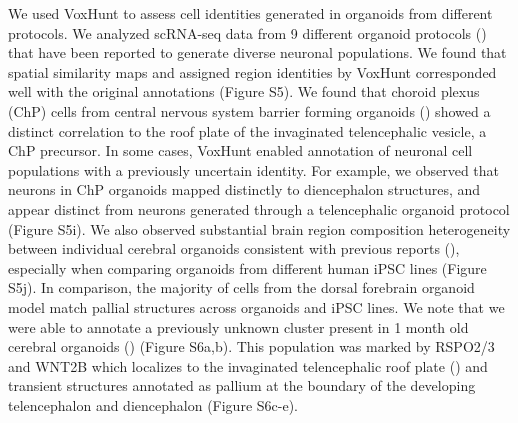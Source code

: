 We used VoxHunt to assess cell identities generated in organoids from different protocols. We analyzed scRNA-seq data from 9 different organoid protocols (\cite{bhaduri_cell_2020,birey_assembly_2017,giandomenico_cerebral_2019,kanton_organoid_2019,pellegrini_human_2020,pollen_establishing_2019,velasco_individual_2019,xiang_hesc-derived_2019}) that have been reported to generate diverse neuronal populations. We found that spatial similarity maps and assigned region identities by VoxHunt corresponded well with the original annotations (Figure S5). We found that choroid plexus (ChP) cells from central nervous system barrier forming organoids (\cite{pellegrini_human_2020}) showed a distinct correlation to the roof plate of the invaginated telencephalic vesicle, a ChP precursor. In some cases, VoxHunt enabled annotation of neuronal cell populations with a previously uncertain identity. For example, we observed that neurons in ChP organoids mapped distinctly to diencephalon structures, and appear distinct from neurons generated through a telencephalic organoid protocol (Figure S5i). We also observed substantial brain region composition heterogeneity between individual cerebral organoids consistent with previous reports (\cite{kanton_organoid_2019}), especially when comparing organoids from different human iPSC lines (Figure S5j). In comparison, the majority of cells from the dorsal forebrain organoid model match pallial structures across organoids and iPSC lines. We note that we were able to annotate a previously unknown cluster present in 1 month old cerebral organoids (\cite{camp_human_2015}) (Figure S6a,b). This population was marked by RSPO2/3 and WNT2B which localizes to the invaginated telencephalic roof plate (\cite{kamata_r-spondin_2004}) and transient structures annotated as pallium at the boundary of the developing telencephalon and diencephalon (Figure S6c-e). 


